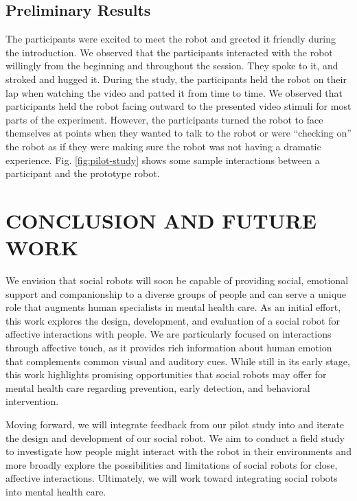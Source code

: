 \documentclass[letterpaper, 10 pt, conference]{ieeeconf}  %
\begin{document}

\subsection{Preliminary Results}
The participants were excited to meet the robot and greeted it friendly during the introduction.
We observed that the participants interacted with the robot willingly from the beginning and throughout the session. They spoke to it, and stroked and hugged it. During the study, the participants held the robot on their lap when watching the video and patted it from time to time. We observed that participants held the robot facing outward to the presented video stimuli for most parts of the experiment. However, the participants turned the robot to face themselves at points when they wanted to talk to the robot or were ``checking on'' the robot as if they were making sure the robot was not having a dramatic experience. Fig. \ref{fig:pilot-study} shows some sample interactions between a participant and the prototype robot. 

\section{CONCLUSION AND FUTURE WORK}
We envision that social robots will soon be capable of providing social, emotional support and companionship to a diverse groups of people and can serve a unique role that augments human specialists in mental health care. As an initial effort, this work explores the design, development, and evaluation of a social robot for affective interactions with people. We are particularly focused on interactions through affective touch, as it provides rich information about human emotion that complements common visual and auditory cues. While still in its early stage, this work highlights promising opportunities that social robots may offer for mental health care regarding prevention, early detection, and behavioral intervention.

Moving forward, we will integrate feedback from our pilot study into and iterate the design and development of our social robot. We aim to conduct a field study to investigate how people might interact with the robot in their environments and more broadly explore the possibilities and limitations of social robots for close, affective interactions. Ultimately, we will work toward integrating social robots into mental health care.
\end{document}
